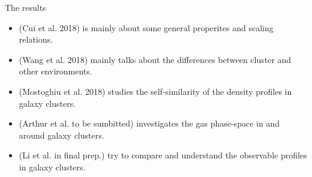 \documentclass[aspectratio=43]{beamer}
\begin{document}
\begin{frame}
  \begin{center}
    {\Huge The results} \\
    \bigskip
  \end{center}
  
  \begin{itemize}
      \item     \hyperlink{intropaper}{} (Cui et al. 2018) is mainly about some general properites and scaling relations.
      \item \hyperlink{Wang}{} (Wang et al. 2018)  mainly talks about the differences between cluster and other environments.
      \item \hyperlink{Mostoghiu}{} (Mostoghiu et al. 2018) studies the self-similarity of the density profiles in galaxy clusters.
      \item \hyperlink{Arthur}{} (Arthur et al. to be sumbitted) investigates the gas phase-space in and around galaxy clusters.
      \item \hyperlink{Li}{} (Li et al. in final prep.) try to compare and understand the observable profiles in galaxy clusters.
  \end{itemize}
\end{frame}
\end{document}
